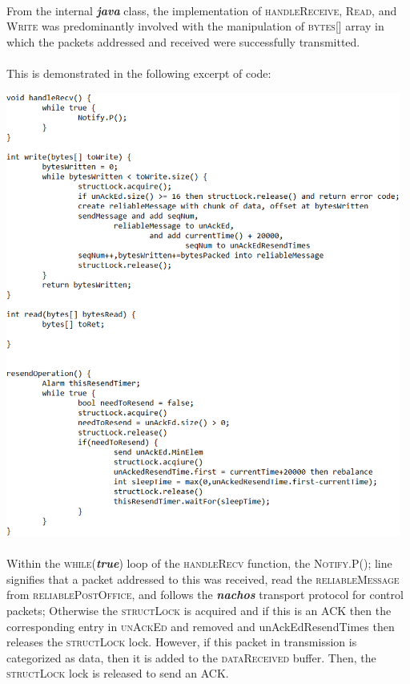 \documentclass[12pt]{article}
\begin{document}
{    \paragraph{} From the internal \textbf{\textit{java}} class, the implementation of \textsc{handleReceive}, \textsc{Read}, and \textsc{Write} was predominantly involved with the manipulation of \textsc{bytes}[] array in which
    the packets addressed and received were successfully transmitted.  \paragraph{}
    \begin{center} This is demonstrated in the following excerpt of code: \end{center}
    \begin{center} \includegraphics[width=130mm]{taskBC.png} \end{center}
    \paragraph{} Within the \textsc{while}(\textbf{\textit{true}}) loop of the \textsc{handleRecv} function, the \textsc{Notify.P}(); line signifies that a packet addressed
    to this was received, read the \textsc{reliableMessage} from \textsc{reliablePostOffice}, and follows the \textit{\textbf{nachos}} transport protocol for control packets; Otherwise the \textsc{structLock} is acquired and if this is an ACK then the corresponding entry in \textsc{unAckEd} and removed and unAckEdResendTimes then releases the \textsc{structLock} lock. 
    However, if this packet in transmission is categorized as data, then it is added to the \textsc{dataReceived} buffer. Then, the \textsc{structLock} lock is released to send an ACK. 
}
\end{document}
